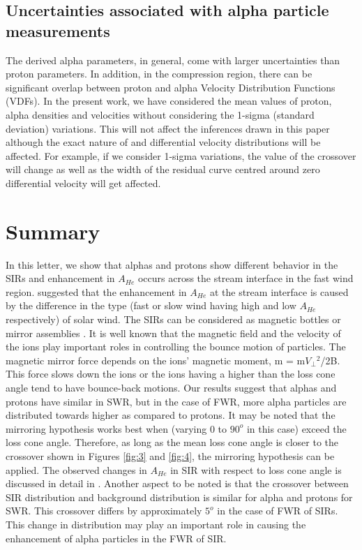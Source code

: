 \documentclass[letters,usenatbib]{mnras}
\begin{document}
\subsection{Uncertainties associated with alpha particle measurements}
 The derived alpha parameters, in general, come with larger uncertainties than proton parameters. In addition, in the compression region, there can be significant overlap between proton and alpha Velocity Distribution Functions (VDFs). In the present work, we have considered the mean values of proton, alpha densities and velocities without considering the 1-sigma (standard deviation) variations. This will not affect the inferences drawn in this paper although the exact nature of  and differential velocity distributions will be affected. For example, if we consider 1-sigma variations, the value of the crossover  will change as well as the width of the residual curve centred around zero differential velocity will get affected.


\section{Summary}
 In this letter, we show that alphas and protons show different behavior in the SIRs and enhancement in $A_{He}$ occurs across the stream interface in the fast wind region. \cite{Gosling1978} suggested that the enhancement in $A_{He}$ at the stream interface is caused by the difference in the type (fast or slow wind having high and low $A_{He}$ respectively) of solar wind. The SIRs can be considered as magnetic bottles or mirror assemblies \citep{Durovcova2019}. It is well known that the magnetic field and the velocity of the ions play important roles in controlling the bounce motion of particles. The magnetic mirror force depends on the ions' magnetic moment, m = m$V_{\perp}{^2}$/2B. This force slows down the ions or the ions having a  higher than the loss cone angle tend to have bounce-back motions. Our results suggest that alphas and protons have similar  in SWR, but in the case of FWR, more alpha particles are distributed towards higher  as compared to protons. It may be noted that the mirroring hypothesis works best when  (varying 0 to $90^o$ in this case) exceed the loss cone angle. Therefore, as long as the mean loss cone angle is closer to the   crossover shown in Figures \ref{fig:3} and \ref{fig:4}, the mirroring hypothesis can be applied. The observed changes in $A_{He}$ in SIR with respect to loss cone angle is discussed in detail in \cite{Durovcova2019}. Another aspect to be noted is that the  crossover between SIR distribution and background distribution is similar for alpha and protons for SWR. This crossover differs by approximately $5^o$ in the case of FWR of SIRs. This change in distribution may play an important role in causing the enhancement of alpha particles in the FWR of SIR. 
 
\end{document}
